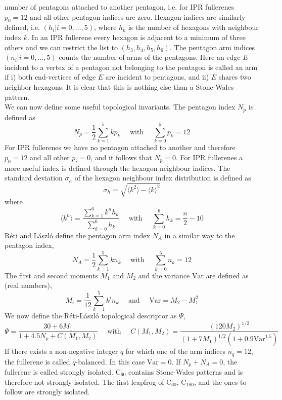 \documentclass[article,a4paper,twoside]{memoir}
\newcommand{\C}[1]{\ensuremath{\mathrm{C}_{#1}}}
\begin{document}
number of pentagons attached to another pentagon, i.e. for IPR fullerenes $p_0 = 12$ and all other pentagon indices are zero. Hexagon indices are similarly
defined, i.e. $(h_i | i=0, \dots , 5)$, where $h_k$ is the number of hexagons with neighbour index $k$. In an IPR fullerene every hexagon is adjacent to a
minimum of three others and we can restrict the list to $(h_3, h_4, h_5, h_6)$. The pentagon arm indices $(n_i | i=0, \dots , 5)$ counts the number of arms
of the pentagons. Here an edge $E$ incident to a vertex of a pentagon not belonging to the pentagon is called an arm if i) both end-vertices of edge $E$ 
are incident to pentagons, and ii) $E$ shares two neighbor hexagons.\cite{Reti} It is clear that this is nothing else than a Stone-Wales pattern.\\
We can now define some useful topological invariants. The pentagon index $N_p$ is defined as
\begin{equation}
  \label{pentindex}
  N_p = \frac{1}{2}\sum_{k=1}^{5} kp_k \quad \text{ with } \quad  \sum_{k=0}^{5} p_k = 12
\end{equation}
For IPR fullerenes we have no pentagon attached to another and therefore $p_0 = 12$ and all other $p_i = 0$, and it follows that $N_p = 0$. For IPR fullerenes
a more useful index is defined through the hexagon neighbour indices. The standard deviation $\sigma_h$ of the hexagon neighbour index distribution is defined as
\begin{equation}
  \label{standev}
  \sigma_h = \sqrt{\langle k^2 \rangle - \langle k \rangle^2}
\end{equation}
where
\begin{equation}
  \label{mean}
  \langle k^n \rangle = \frac{\sum_{k=1}^{6} k^n h_k}{\sum_{k=0}^{6} h_k}  \quad \text{ with } \quad  \sum_{k=0}^{6} h_k = \frac{n}{2} - 10
\end{equation}
R\'eti and L\'aszl\'o define the pentagon arm index $N_A$ in a similar way to the pentagon index,\cite{Reti}
\begin{equation}
  \label{arms}
  N_A = \frac{1}{2}\sum_{k=1}^{5} kn_k  \quad \text{ with } \quad  \sum_{k=0}^{5} n_k = 12
\end{equation}
The first and second moments $M_1$ and $M_2$ and the variance $\text{Var}$ are defined as (real numbers),
\begin{equation}
  \label{Moments}
  M_i = \frac{1}{12}\sum_{k=1}^{5} k^i n_k  \quad \text{ and } \quad  \text{Var}= M_2 - M_1^2
\end{equation}
We now define the R\'eti-L\'aszl\'o topological descriptor as $\Psi$,
\begin{equation}
  \label{Moments}
  \Psi = \frac{30+6M_1}{1+4.5N_p+C(M_1,M_2)} \quad \text{ with } \quad  C(M_1,M_2) = \frac{(120M_2)^{1/2}}{(1+7M_1)^{1/2}(1+0.9\text{Var}^{1.5})}
\end{equation}
If there exists a non-negative integer $q$ for which one of the arm indices $n_q = 12$, the fullerene is called $q$-balanced. In this
case $\text{Var} = 0$.\cite{Reti} If $N_p + N_A = 0$, the fullerene is called strongly isolated. \C{60} contains Stone-Wales patterns and is therefore not
strongly isolated. The first leapfrog of \C{60}, \C{180}, and the ones to follow are strongly isolated.
\end{document}
